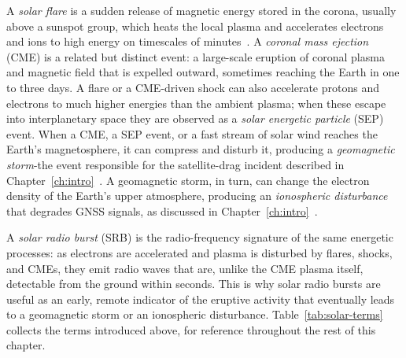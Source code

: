 A \emph{solar flare} is a sudden release of magnetic energy stored in the
corona, usually above a sunspot group, which heats the local plasma and
accelerates electrons and ions to high energy on timescales of
minutes~\citep{dulk1985,mclean1985}. A \emph{coronal mass ejection} (CME) is a
related but distinct event: a large-scale eruption of coronal plasma and
magnetic field that is expelled outward, sometimes reaching the Earth in one
to three days. A flare or a CME-driven shock can also accelerate protons and
electrons to much higher energies than the ambient plasma; when these escape
into interplanetary space they are observed as a \emph{solar energetic
particle} (SEP) event. When a CME, a SEP event, or a fast stream of solar
wind reaches the Earth's magnetosphere, it can compress and disturb it,
producing a \emph{geomagnetic storm}-the event responsible for the
satellite-drag incident described in
Chapter~\ref{ch:intro}~\citep{berger2023starlink}. A geomagnetic storm, in
turn, can change the electron density of the Earth's upper atmosphere,
producing an \emph{ionospheric disturbance} that degrades GNSS signals, as
discussed in Chapter~\ref{ch:intro}~\citep{floressoriano2024gnss}.

A \emph{solar radio burst} (SRB) is the radio-frequency signature of the same
energetic processes: as electrons are accelerated and plasma is disturbed by
flares, shocks, and CMEs, they emit radio waves that are, unlike the CME
plasma itself, detectable from the ground within seconds. This is why solar
radio bursts are useful as an early, remote indicator of the eruptive
activity that eventually leads to a geomagnetic storm or an ionospheric
disturbance. Table~\ref{tab:solar-terms} collects the terms introduced above,
for reference throughout the rest of this chapter.

